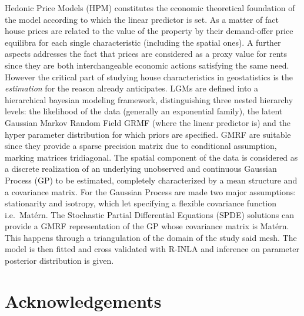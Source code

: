 \documentclass[
  12pt,
  a4paper,
  oneside]{book}
\theoremstyle{definition}
\theoremstyle{definition}
\theoremstyle{definition}
\theoremstyle{remark}
\begin{document}
Hedonic Price Models (HPM) constitutes the economic theoretical foundation of the model according to which the linear predictor is set. As a matter of fact house prices are related to the value of the property by their demand-offer price equilibra for each single characteristic (including the spatial ones). A further aspects addresses the fact that prices are considered as a proxy value for rents since they are both interchangeable economic actions satisfying the same need. However the critical part of studying house characteristics in geostatistics is the \emph{estimation} for the reason already anticipates.
LGMs are defined into a hierarchical bayesian modeling framework, distinguishing three nested hierarchy levels: the likelihood of the data (generally an exponential family), the latent Gaussian Markov Random Field GRMF (where the linear predictor is) and the hyper parameter distribution for which priors are specified. GMRF are suitable since they provide a sparse precision matrix due to conditional assumption, marking matrices tridiagonal. The spatial component of the data is considered as a discrete realization of an underlying unobserved and continuous Gaussian Process (GP) to be estimated, completely characterized by a mean structure and a covariance matrix. For the Gaussian Process are made two major assumptions: stationarity and isotropy, which let specifying a flexible covariance function i.e.~Matérn.
The Stochastic Partial Differential Equations (SPDE) solutions can provide a GMRF representation of the GP whose covariance matrix is Matérn. This happens through a triangulation of the domain of the study said mesh. The model is then fitted and cross validated with R-INLA and inference on parameter posterior distribution is given.

\hypertarget{acknowledgements}{%
\section*{Acknowledgements}\label{acknowledgements}}
\end{document}
